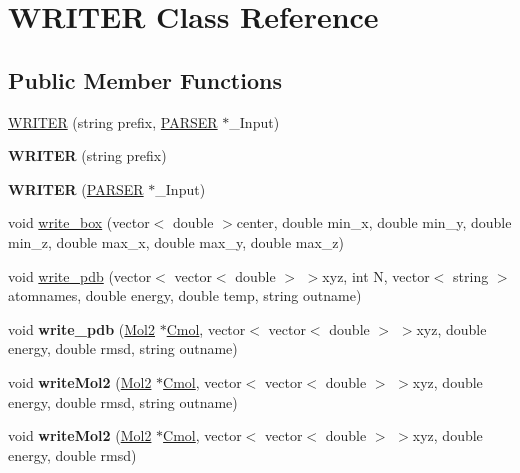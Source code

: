 \hypertarget{classWRITER}{
\section{WRITER Class Reference}
\label{classWRITER}
}
\subsection*{Public Member Functions}
\begin{DoxyCompactItemize}
\item 
\hyperlink{classWRITER_a307cdce6b130bef1464f6314c282357a}{WRITER} (string prefix, \hyperlink{classPARSER}{PARSER} $\ast$\_\-Input)
\item 
\hypertarget{classWRITER_a74b98ae5522d2c7ade60d66ee7645209}{
{\bfseries WRITER} (string prefix)}
\label{classWRITER_a74b98ae5522d2c7ade60d66ee7645209}

\item 
\hypertarget{classWRITER_a4f06e34397eece428f5d18f03d4e42ff}{
{\bfseries WRITER} (\hyperlink{classPARSER}{PARSER} $\ast$\_\-Input)}
\label{classWRITER_a4f06e34397eece428f5d18f03d4e42ff}

\item 
void \hyperlink{classWRITER_aa111d42a3e15462bc5f1e5d450220ac4}{write\_\-box} (vector$<$ double $>$center, double min\_\-x, double min\_\-y, double min\_\-z, double max\_\-x, double max\_\-y, double max\_\-z)
\item 
void \hyperlink{classWRITER_a953d816265ab366b0e700cfb1083a9c1}{write\_\-pdb} (vector$<$ vector$<$ double $>$ $>$xyz, int N, vector$<$ string $>$ atomnames, double energy, double temp, string outname)
\item 
\hypertarget{classWRITER_a28080617b6da0a6e6c4b620c5ec21cda}{
void {\bfseries write\_\-pdb} (\hyperlink{classMol2}{Mol2} $\ast$\hyperlink{classWRITER_aaea0524b142c7c6e27082d070b5ba95c}{Cmol}, vector$<$ vector$<$ double $>$ $>$xyz, double energy, double rmsd, string outname)}
\label{classWRITER_a28080617b6da0a6e6c4b620c5ec21cda}

\item 
\hypertarget{classWRITER_a93e648a726d4d74a6935df22a9fef5aa}{
void {\bfseries writeMol2} (\hyperlink{classMol2}{Mol2} $\ast$\hyperlink{classWRITER_aaea0524b142c7c6e27082d070b5ba95c}{Cmol}, vector$<$ vector$<$ double $>$ $>$xyz, double energy, double rmsd, string outname)}
\label{classWRITER_a93e648a726d4d74a6935df22a9fef5aa}

\item 
\hypertarget{classWRITER_a94626976f7f68f2ba5d16a3b9db64b9a}{
void {\bfseries writeMol2} (\hyperlink{classMol2}{Mol2} $\ast$\hyperlink{classWRITER_aaea0524b142c7c6e27082d070b5ba95c}{Cmol}, vector$<$ vector$<$ double $>$ $>$xyz, double energy, double rmsd)}
\label{classWRITER_a94626976f7f68f2ba5d16a3b9db64b9a}


\end{DoxyCompactItemize}
